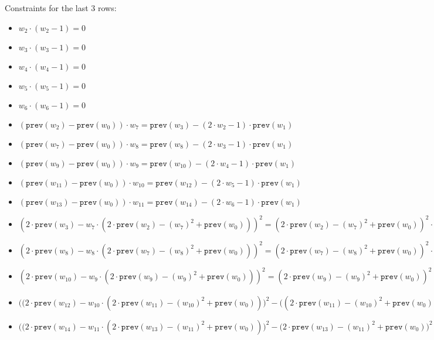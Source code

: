 Constraints for the last $3$ rows:
\begin{itemize}
    \item $w_2 \cdot (w_2 - 1) = 0$
    \item $w_3 \cdot (w_3 - 1) = 0$
    \item $w_4 \cdot (w_4 - 1) = 0$
    \item $w_5 \cdot (w_5 - 1) = 0$
    \item $w_6 \cdot (w_6 - 1) = 0$ \\

    \item $(\texttt{prev}(w_{2}) - \texttt{prev}(w_{0})) \cdot w_7 = \texttt{prev}(w_3) - (2 \cdot w_{2} - 1) \cdot \texttt{prev}(w_1)$
    \item $(\texttt{prev}(w_{7}) - \texttt{prev}(w_{0})) \cdot w_8 = \texttt{prev}(w_8) - (2 \cdot w_{3} - 1) \cdot \texttt{prev}(w_1)$
    \item $(\texttt{prev}(w_{9}) - \texttt{prev}(w_{0})) \cdot w_9 = \texttt{prev}(w_{10}) - (2 \cdot w_{4} - 1) \cdot \texttt{prev}(w_1)$
    \item $(\texttt{prev}(w_{11}) - \texttt{prev}(w_{0})) \cdot w_{10} = \texttt{prev}(w_{12}) - (2 \cdot w_{5} - 1) \cdot \texttt{prev}(w_1)$
    \item $(\texttt{prev}(w_{13}) - \texttt{prev}(w_{0})) \cdot w_{11} = \texttt{prev}(w_{14}) - (2 \cdot w_{6} - 1) \cdot \texttt{prev}(w_1)$ \\
    
    
    \item $(2\cdot \texttt{prev}(w_{3}) - w_7 \cdot (2 \cdot \texttt{prev}(w_2) - (w_7)^2 + \texttt{prev}(w_{0})))^2           =  (2 \cdot \texttt{prev}(w_2) - (w_7)^2 + \texttt{prev}(w_{0}))^2 \cdot (\texttt{prev}(w_7) - \texttt{prev}(w_0) + (w_7)^2)$
    \item $(2\cdot \texttt{prev}(w_{8}) - w_8 \cdot (2 \cdot \texttt{prev}(w_7) - (w_8)^2 + \texttt{prev}(w_{0})))^2           =  (2 \cdot \texttt{prev}(w_7) - (w_8)^2 + \texttt{prev}(w_{0}))^2 \cdot (\texttt{prev}(w_9) - \texttt{prev}(w_0) + (w_8)^2)$
    \item $(2\cdot \texttt{prev}(w_{10}) - w_9 \cdot (2 \cdot \texttt{prev}(w_9) - (w_9)^2 + \texttt{prev}(w_{0})))^2          =  (2 \cdot \texttt{prev}(w_9) - (w_9)^2 + \texttt{prev}(w_{0}))^2 \cdot (\texttt{prev}(w_{11}) - \texttt{prev}(w_0) + (w_9)^2)$
    \item $\biggl( \bigl(2\cdot \texttt{prev}(w_{12}) - w_{10} \cdot (2 \cdot \texttt{prev}(w_{11}) - (w_{10})^2 + \texttt{prev}(w_{0}))\bigr)^2 - \bigl((2 \cdot \texttt{prev}(w_{11}) - (w_{10})^2 + \texttt{prev}(w_{0}))^2 \cdot (\texttt{prev}(w_{13}) - \texttt{prev}(w_0) + (w_{10})^2)\bigr)\biggr) \cdot (\texttt{next}(w_8) \cdot \texttt{next}(w_2)) = 0$
    \item $\biggl( \bigl(2\cdot \texttt{prev}(w_{14}) - w_{11} \cdot (2 \cdot \texttt{prev}(w_{13}) - (w_{11})^2 + \texttt{prev}(w_{0}))\bigr)^2 - \bigl(2 \cdot \texttt{prev}(w_{13}) - (w_{11})^2 + \texttt{prev}(w_{0}))^2 \cdot (w_0 - \texttt{prev}(w_0) + (w_{11})^2)\bigr) \biggr) \cdot (\texttt{next}(w_8) \cdot \texttt{next}(w_2)) = 0$\\
    

\end{itemize}
